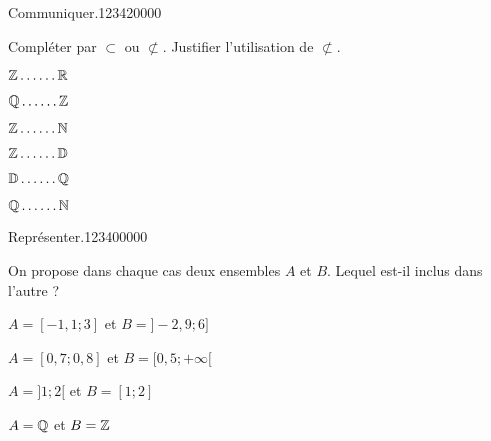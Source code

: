 
\begin{pageAD}  %
\restoregeometry %

 
  
\begin{ExoCad}{Communiquer.}{1234}{2}{0}{0}{0}{0}

Compléter par $\subset$  ou $\not\subset$. Justifier l'utilisation de  $\not\subset$.

\begin{enumerate}
\begin{minipage}{0.49\linewidth}
\item $\mathbb Z \ldots \ldots \mathbb R$ 
\item $\mathbb Q \ldots \ldots \mathbb Z$ 
\item $\mathbb Z \ldots \ldots \mathbb N$ 
\end{minipage}
\hfill
\begin{minipage}{0.49\linewidth}
\item $\mathbb Z \ldots \ldots \mathbb D$ 
\item $\mathbb D \ldots \ldots \mathbb Q$ 
\item $\mathbb Q \ldots \ldots \mathbb N$ 
\end{minipage}
\end{enumerate}
 
\end{ExoCad}

\begin{ExoCad}{Représenter.}{1234}{0}{0}{0}{0}{0}

On propose dans chaque cas deux ensembles $A$ et $B$. Lequel est-il inclus dans l'autre ? \vspace{0.2cm} 

\begin{enumerate}

\begin{minipage}{0.48\linewidth}
\item $A=[-1,1;3]$ et $B=]-2,9;6]$ 
\item $A=[0,7;0,8]$ et $B=[0,5;+\infty[$
\end{minipage}
\hfill
\begin{minipage}{0.48\linewidth}
\item $A=]1;2[$ et $B=[1;2]$
\item $A=\mathbb Q$ et $B=\mathbb Z$
\end{minipage}


\end{enumerate}
\end{ExoCad}
\end{pageAD}
